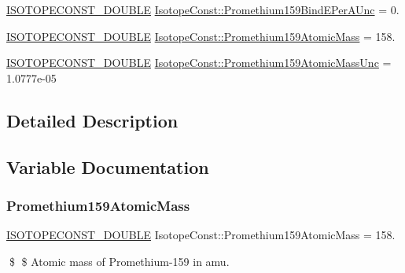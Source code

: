 \begin{DoxyCompactItemize}
\item 
\mbox{\hyperlink{group___isotope_const-_macros_ga8f45a7272ce02c0b4c65c44636ed719a}{I\+S\+O\+T\+O\+P\+E\+C\+O\+N\+S\+T\+\_\+\+D\+O\+U\+B\+LE}} \mbox{\hyperlink{group___isotope_const-_promethium-_pm159_ga9275c949b1fd96ad3946774126b9b16b}{Isotope\+Const\+::\+Promethium159\+Bind\+E\+Per\+A\+Unc}} = 0.
\item 
\mbox{\hyperlink{group___isotope_const-_macros_ga8f45a7272ce02c0b4c65c44636ed719a}{I\+S\+O\+T\+O\+P\+E\+C\+O\+N\+S\+T\+\_\+\+D\+O\+U\+B\+LE}} \mbox{\hyperlink{group___isotope_const-_promethium-_pm159_ga41724f588d41abd11b5ce19694f2e866}{Isotope\+Const\+::\+Promethium159\+Atomic\+Mass}} = 158.
\item 
\mbox{\hyperlink{group___isotope_const-_macros_ga8f45a7272ce02c0b4c65c44636ed719a}{I\+S\+O\+T\+O\+P\+E\+C\+O\+N\+S\+T\+\_\+\+D\+O\+U\+B\+LE}} \mbox{\hyperlink{group___isotope_const-_promethium-_pm159_gaeebd54934b68b375efd27866ca3f0c97}{Isotope\+Const\+::\+Promethium159\+Atomic\+Mass\+Unc}} = 1.\+0777e-\/05
\end{DoxyCompactItemize}


\subsection{Detailed Description}


\subsection{Variable Documentation}
\mbox{\label{group___isotope_const-_promethium-_pm159_ga41724f588d41abd11b5ce19694f2e866}} 
\subsubsection{\texorpdfstring{Promethium159\+Atomic\+Mass}{Promethium159AtomicMass}}
{\footnotesize\ttfamily \mbox{\hyperlink{group___isotope_const-_macros_ga8f45a7272ce02c0b4c65c44636ed719a}{I\+S\+O\+T\+O\+P\+E\+C\+O\+N\+S\+T\+\_\+\+D\+O\+U\+B\+LE}} Isotope\+Const\+::\+Promethium159\+Atomic\+Mass = 158.}

\$ \$ Atomic mass of Promethium-\/159 in amu. \mbox{\label{group___isotope_const-_promethium-_pm159_gaeebd54934b68b375efd27866ca3f0c97}} 
